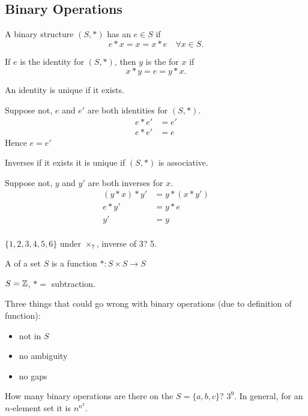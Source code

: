 \documentclass[class=article,crop=false]{standalone}
\begin{document}
\subsection{Binary Operations}
\begin{defn}[Identity]
	A binary structure $(S,*)$ has an  $e \in S$ if 
	\[
	e*x=x=x*e \quad \forall x \in S
	.\] 
\end{defn}
\begin{defn}[Inverse]
	If $e$ is the identity for $(S,*)$, then  $y$ is the   for $x$ if
	 \[
	x*y=e=y*x
	.\] 
\end{defn}
\begin{thm}[]
An identity is unique if it exists.
\end{thm}
\begin{prf}
	Suppose not, $e$ and  $e'$ are both identities for  $(S,*)$.
	 \begin{align*}
		e*e'&= e' \\
		e*e'&= e
	\end{align*}
	Hence $e=e'$
\end{prf} 

\begin{thm}[]
	Inverses if it exists it is unique if $(S,*)$ is associative.
\end{thm}
\begin{prf}
Suppose not, $y$ and $y'$ are both inverses for  $x$. 
 \begin{align*}
	 (y*x)*y' &= y*(x*y')\\
	 e*y' &= y*e \\
	 y'&= y \\
\end{align*}
\end{prf}

\begin{eg}[]
$\{ 1,2,3,4,5,6\} $ under $\times_7$, inverse of $3$? 5.
\end{eg}

\begin{defn}
	A  of a set $S$ is a function  $*: S \times S \to S$ 
\end{defn}
\begin{eg}[]
$S=\mathbb{Z}$, $*=$ subtraction. 
\end{eg}

Three things that could go wrong with binary operations (due to definition of function):
\begin{itemize}
	\item not in $S$
	\item no ambiguity
	\item no gaps
\end{itemize}
How many binary operations are there on the $S=\{a,b,c\}$? $3^{9}$.
In general, for an $n$-element set it is  $n^{n^2}$.
\end{document}
